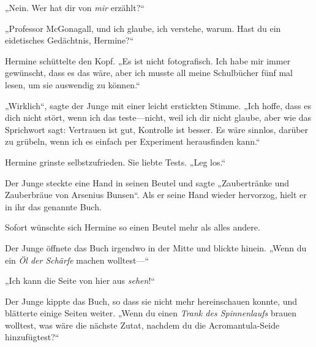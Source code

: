 „Nein. Wer hat dir von \emph{mir} erzählt?“

„Professor McGonagall, und ich glaube, ich verstehe, warum. Hast du ein eidetisches Gedächtnis, Hermine?“

Hermine schüttelte den Kopf. „Es ist nicht fotografisch. Ich habe mir immer gewünscht, dass es das wäre, aber ich musste all meine Schulbücher fünf mal lesen, um sie auswendig zu können.“

„Wirklich“, sagte der Junge mit einer leicht erstickten Stimme. „Ich hoffe, dass es dich nicht stört, wenn ich das teste—nicht, weil ich dir nicht glaube, aber wie das Sprichwort sagt: Vertrauen ist gut, Kontrolle ist besser. Es wäre sinnlos, darüber zu grübeln, wenn ich es einfach per Experiment herausfinden kann.“

Hermine grinste selbstzufrieden. Sie liebte Tests. „Leg los.“

Der Junge steckte eine Hand in seinen Beutel und sagte „Zaubertränke und Zauberbräue von Arsenius Bunsen“. Als er seine Hand wieder hervorzog, hielt er in ihr das genannte Buch.

Sofort wünschte sich Hermine so einen Beutel mehr als alles andere.

Der Junge öffnete das Buch irgendwo in der Mitte und blickte hinein. „Wenn du ein \emph{Öl der Schärfe} machen wolltest—“

„Ich kann die Seite von hier aus \emph{sehen}!“

Der Junge kippte das Buch, so dass sie nicht mehr hereinschauen konnte, und blätterte einige Seiten weiter. „Wenn du einen \emph{Trank des Spinnenlaufs} brauen wolltest, was wäre die nächste Zutat, nachdem du die Acromantula-Seide hinzufügtest?“

